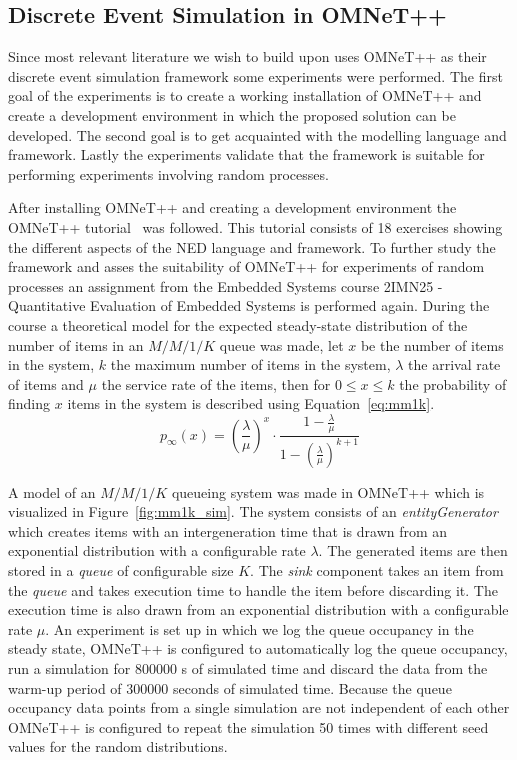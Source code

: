 \subsection{Discrete Event Simulation in OMNeT++}
\label{sec:omnetpp}
Since most relevant literature we wish to build upon uses OMNeT++ as their discrete event simulation framework some experiments were performed. The first goal of the experiments is to create a working installation of OMNeT++ and create a development environment in which the proposed solution can be developed. The second goal is to get acquainted with the modelling language and framework. Lastly the experiments validate that the framework is suitable for performing experiments involving random processes.

After installing OMNeT++ and creating a development environment the OMNeT++ tutorial~\cite{omnettutorial} was followed. This tutorial consists of 18 exercises showing the different aspects of the NED language and framework. To further study the framework and asses the suitability of OMNeT++ for experiments of random processes an assignment from the Embedded Systems course 2IMN25 - Quantitative Evaluation of Embedded Systems is performed again. During the course a theoretical model for the expected steady-state distribution of the number of items in an $M/M/1/K$ queue was made, let $x$ be the number of items in the system, $k$ the maximum number of items in the system, $\lambda$ the arrival rate of items and $\mu$ the service rate of the items, then for $0 \leq x\leq k$ the probability of finding $x$ items in the system is described using Equation~\ref{eq:mm1k}. 
\begin{equation}
    \label{eq:mm1k}
p_\infty (x) = \left(\frac{\lambda}{\mu}\right)^x\cdot\frac{1-\frac{\lambda}{\mu}}{1-\left(\frac{\lambda}{\mu}\right)^{k+1}}
\end{equation}

A model of an $M/M/1/K$ queueing system was made in OMNeT++ which is visualized in Figure~\ref{fig:mm1k_sim}. The system consists of an \textit{entityGenerator} which creates items with an intergeneration time that is drawn from an exponential distribution with a configurable rate $\lambda$. The generated items are then stored in a \textit{queue} of configurable size $K$. The \textit{sink} component takes an item from the \textit{queue} and takes execution time to handle the item before discarding it. The execution time is also drawn from an exponential distribution with a configurable rate $\mu$. An experiment is set up in which we log the queue occupancy in the steady state, OMNeT++ is configured to automatically log the queue occupancy, run a simulation for 800000 s of simulated time and discard the data from the warm-up period of 300000 seconds of simulated time. Because the queue occupancy data points from a single simulation are not independent of each other OMNeT++ is configured to repeat the simulation 50 times with different seed values for the random distributions.

